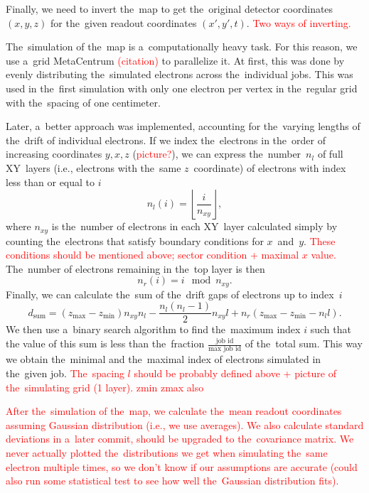 		Finally, we need to invert the~map to get the~original detector coordinates $(x,y,z)$ for the~given readout coordinates $(x',y',t)$. \textcolor{red}{Two ways of inverting.}
		
		The~simulation of the~map is a~computationally heavy task. For this reason, we use a~grid MetaCentrum \textcolor{red}{(citation)} to parallelize it. At first, this was done by evenly distributing the~simulated electrons across the~individual jobs. This was used in the~first simulation with only one electron per vertex in the~regular grid with the~spacing of one centimeter. 
		
		Later, a~better approach was implemented, accounting for the~varying lengths of the~drift of individual electrons. If we index the~electrons in the~order of increasing coordinates $y,x,z$ (\textcolor{red}{picture?}), we can express the~number~$n_l$ of full XY~layers (i.e., electrons with the~same $z$~coordinate) of electrons with index less than or equal to $i$
			\begin{equation}
				n_l(i) = \left\lfloor\frac{i}{n_{xy}}\right\rfloor,
			\end{equation}
		where $n_{xy}$ is the~number of electrons in each XY~layer calculated simply by counting the~electrons that satisfy boundary conditions for $x$~and~$y$. \textcolor{red}{These conditions should be mentioned above; sector condition + maximal $x$ value.} The~number of electrons remaining in the~top layer is then
			\begin{equation}
				n_r(i) = i\!\!\!\!\mod n_{xy}.
			\end{equation}
		Finally, we can calculate the~sum of the~drift gaps of electrons up to index~$i$
			\begin{equation}
				d_\text{sum} = (z_\text{max}-z_\text{min})n_{xy}n_l-\frac{n_l(n_l-1)}{2}n_{xy}l+n_r(z_\text{max}-z_\text{min}-n_l l).
			\end{equation}
		We then use a~binary search algorithm to find the~maximum index $i$ such that the value of this sum is less than the~fraction $\frac{\text{job id}}{\text{max job id}}$ of the~total sum. This way we obtain the~minimal and the~maximal index of electrons simulated in the~given job.
		\textcolor{red}{The~spacing $l$ should be probably defined above + picture of the~simulating grid (1 layer). zmin zmax also}
		
		\textcolor{red}{After the~simulation of the~map, we calculate the~mean readout coordinates assuming Gaussian distribution (i.e., we use averages). We also calculate standard deviations in a~later commit, should be upgraded to the~covariance matrix. We never actually plotted the~distributions we get when simulating the~same electron multiple times, so we don't know if our assumptions are accurate (could also run some statistical test to see how well the~Gaussian distribution fits).}
		
